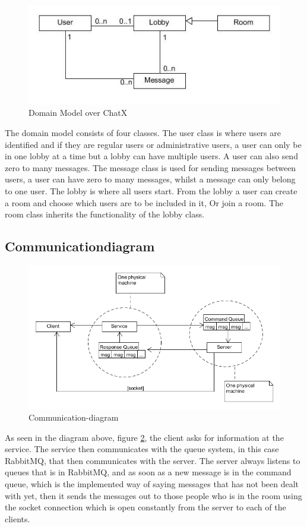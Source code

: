 \begin{figure}[H]
\centering
\includegraphics[width=0.7\linewidth]{img/DomainModelChatX}
\caption{Domain Model over ChatX}
\label{fig:DomainModelChatX}
\end{figure}

The domain model consists of four classes. The user class is where users are identified and if they are regular users or administrative users, a user can only be in one lobby at a time but a lobby can have multiple users. A user can also send zero to many messages. The message class is used for sending messages between users, a user can have zero to many messages, whilst a message can only belong to one user. The lobby is where all users start. From the lobby a user can create a room and choose which users are to be included in it, Or join a room. The room class inherits the functionality of the lobby class.

\clearpage
\subsection{Communicationdiagram}

\begin{figure}[h]
\centering
\includegraphics[width=0.7\linewidth]{img/CommunicationDiag}
\caption[Communication-diagram]{Communication-diagram}
\label{fig:Communicationdiagram}
\end{figure}

As seen in the diagram above, figure \ref{fig:Communicationdiagram}, the client asks for information at the service. The service then communicates with the queue system, in this case RabbitMQ, that then communicates with the server. The server always listens to queues that is in RabbitMQ, and as soon as a new message is in the command queue, which is the implemented way of saying messages that has not been dealt with yet, then it sends the messages out to those people who is in the room using the socket connection which is open constantly from the server to each of the clients.

